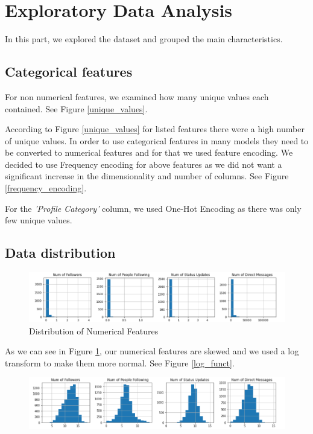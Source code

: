 \documentclass[sigplan,screen]{acmart}
\begin{document}
\section{Exploratory Data Analysis}
In this part, we explored the dataset and grouped the main characteristics.

\subsection{Categorical features}
For non numerical features, we examined how many unique values each contained. See Figure \ref{unique_values}.



\noindent According to Figure \ref{unique_values} for listed features there were a high number of unique values. In order to use categorical features in many models they need to be converted to numerical features and for that we used feature encoding. We decided to use Frequency encoding for above features as we did not want a significant increase in the dimensionality and number of columns. See Figure \ref{frequency_encoding}.

\noindent For the \textit{'Profile Category'} column, we used One-Hot Encoding as there was only few unique values.

\subsection{Data distribution}
\begin{figure}[H]
\centering
\includegraphics[width=\columnwidth]{skewed.png}
\caption{Distribution of Numerical Features}\label{num_feat_dist}
\end{figure}

\noindent As we can see in Figure \ref{num_feat_dist}, our numerical features are skewed and we used a log transform to make them more normal. See Figure \ref{log_funct}.


\begin{figure}[H]
\centering
\includegraphics[width=\columnwidth]{normal.png}
\end{figure}
\end{document}
